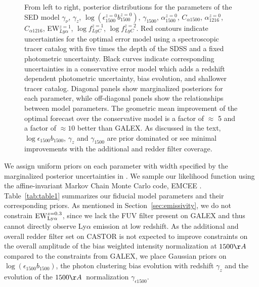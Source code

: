 \documentclass[fleqn,usenatbib]{mnras}
\begin{document}
\begin{figure*}
    \begin{center}
\caption{\label{fig:corner} From left to right, posterior distributions for the parameters of the SED model $\gamma_{\nu}$, $\gamma_z$, $\log(\epsilon_{1500}^{z=0} b_{1500}^{z=0})$, $\gamma_{1500}$, $\alpha_{1500}^{z=0}$, $C_{\alpha 1500}$, $\alpha_{1216}^{z=0}$, $C_{\alpha 1216}$, EW$_{Ly\alpha}^{z=1}$, $\log f^{z=1}_{LyC}$, $\log f^{z=2}_{LyC}$. Red contours indicate uncertainties for the optimal error model using a spectroscopic tracer catalog with five times the depth of the SDSS and a fixed photometric uncertainty. Black curves indicate corresponding uncertainties in a conservative error model which adds a redshift dependent photometric uncertainty, bias evolution, and shallower tracer catalog. Diagonal panels show marginalized posteriors for each parameter, while off-diagonal panels show the relationships between model parameters. The geometric mean improvement of the optimal forecast over the conservative model is a factor of $\approx$ 5 and a factor of $\approx 10$ better than GALEX. As discussed in the text, $\log{\epsilon_{1500}b_{1500}}$, $\gamma_z$ and $\gamma_{1500}$ are prior dominated or see minimal improvements with the additional and redder filter coverage.}
    \end{center}
\end{figure*}

We assign uniform priors on each parameter with width specified by the marginalized posterior uncertainties in \cite{Chiang_2019}. We sample our likelihood function using the affine-invariant Markov Chain Monte Carlo code, {\small EMCEE} \citep{Foreman_Mackey_2013}. Table~\ref{tab:table1} summarizes our fiducial model parameters and their corresponding priors. As mentioned in Section~\ref{sec:emissivity}, we do not constrain ${\rm EW}_{\rm Ly\alpha}^{z=0.3}$, since we lack the FUV filter present on GALEX and thus cannot directly observe Ly$\alpha$ emission at low redshift. As the additional and overall redder filter set on {\small CASTOR} is not expected to improve constraints on the overall amplitude of the bias weighted intensity normalization at $1500 \AA$ compared to the constraints from {\small GALEX}, we place Gaussian priors on $\log(\epsilon_{1500} b_{1500})$, the photon clustering bias evolution with redshift $\gamma_z$ and the evolution of the $1500 \AA$~normalization $\gamma_{\epsilon 1500}$. 
\end{document}

